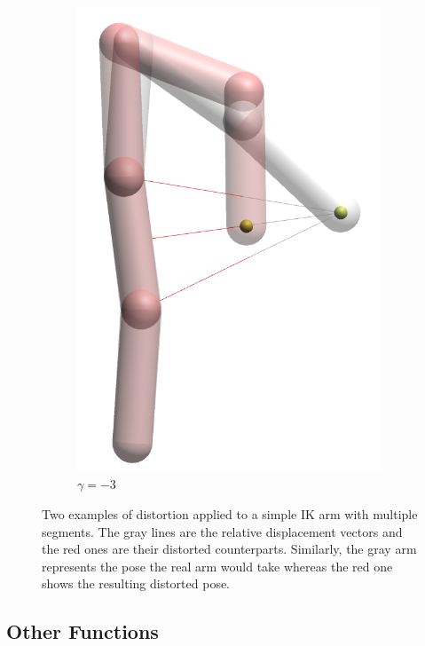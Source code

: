 \begin{figure}
\begin{subfigure}[b]{0.2\textwidth}
        \includegraphics[width=\textwidth]{Figures/simple_distortion_-3.png}
        \caption{$\gamma = -3$}
    \end{subfigure}
    \caption{Two examples of distortion applied to a simple IK arm with multiple segments. The gray lines are the relative displacement vectors and the red ones are their distorted counterparts. Similarly, the gray arm represents the pose the real arm would take whereas the red one shows the resulting distorted pose. }\label{fig:armExamples}
\end{figure}

\subsection*{Other Functions}

